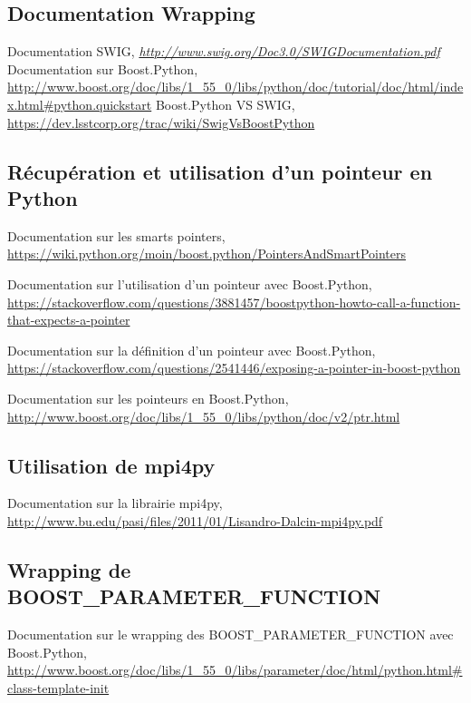 \documentclass[french,12pt]{article}
\begin{document}
\begin{thebibliography}{99}
\subsection{Documentation Wrapping}
\raggedright
{}
Documentation SWIG, 
\emph{\url{http://www.swig.org/Doc3.0/SWIGDocumentation.pdf}}
Documentation sur Boost.Python,
\url{http://www.boost.org/doc/libs/1_55_0/libs/python/doc/tutorial/doc/html/index.html#python.quickstart}
Boost.Python VS SWIG,
\url{https://dev.lsstcorp.org/trac/wiki/SwigVsBoostPython}

\subsection{Récupération et utilisation d'un pointeur en Python}

Documentation sur les smarts pointers,\newline
\url{https://wiki.python.org/moin/boost.python/PointersAndSmartPointers}

Documentation sur l'utilisation d'un pointeur avec Boost.Python,
\url{https://stackoverflow.com/questions/3881457/boostpython-howto-call-a-function-that-expects-a-pointer}

Documentation sur la définition d'un pointeur avec Boost.Python,
\url{https://stackoverflow.com/questions/2541446/exposing-a-pointer-in-boost-python}

Documentation sur les pointeurs en Boost.Python,\newline
\url{http://www.boost.org/doc/libs/1_55_0/libs/python/doc/v2/ptr.html}

\subsection{Utilisation de mpi4py}

Documentation sur la librairie mpi4py,
\url{http://www.bu.edu/pasi/files/2011/01/Lisandro-Dalcin-mpi4py.pdf}

\subsection{Wrapping de BOOST\_PARAMETER\_FUNCTION}

Documentation sur le wrapping des BOOST\_PARAMETER\_FUNCTION avec Boost.Python,\newline
\url{http://www.boost.org/doc/libs/1_55_0/libs/parameter/doc/html/python.html#class-template-init}


\end{thebibliography}
\end{document}

